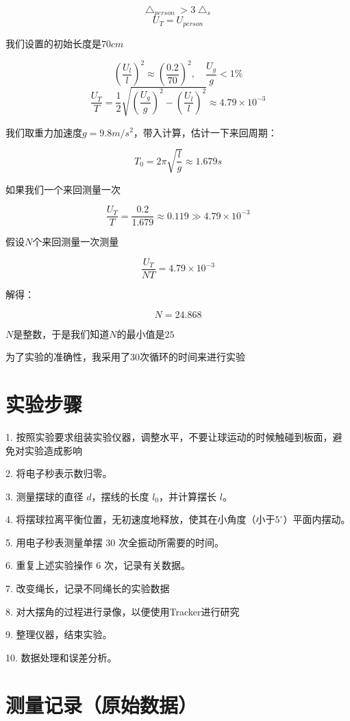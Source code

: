 \documentclass{article}
\begin{document}
        \[\bigtriangleup_{person}>3\bigtriangleup_{s}\]
        \[U_{T}=U_{person}\]

        我们设置的初始长度是$70cm$

        \[(\frac{U_{l}}{l})^2\approx (\frac{0.2}{70})^2 ,\quad \frac{U_{g}}{g}<1\%\]
        \[\frac{U_{T}}{T}=\frac{1}{2}\sqrt{(\frac{U_{g}}{g})^2-(\frac{U_{l}}{l})^2}\approx 4.79\times 10^{-3}\]

        我们取重力加速度$g=9.8m/s^{2}$，带入计算，估计一下来回周期：

        \[T_{0}=2\pi\sqrt{\frac{l}{g}}\approx 1.679s\]

        如果我们一个来回测量一次

        \[\frac{U_{T}}{T}=\frac{0.2}{1.679}\approx 0.119 \gg 4.79\times 10^{-3}\]

        假设$N$个来回测量一次测量

        \[\frac{U_{T}}{NT}=4.79\times 10^{-3}\]

        解得：

        \[N=24.868\]

        $N$是整数，于是我们知道$N$的最小值是$25$

        为了实验的准确性，我采用了30次循环的时间来进行实验

\section{实验步骤}

    1. 按照实验要求组装实验仪器，调整水平，不要让球运动的时候触碰到板面，避免对实验造成影响

    2. 将电子秒表示数归零。

    3. 测量摆球的直径 $d$，摆线的长度 $l_{0}$，并计算摆长 $l$。

    4. 将摆球拉离平衡位置，无初速度地释放，使其在小角度（小于$5^\circ $）平面内摆动。
    
    5. 用电子秒表测量单摆 30 次全振动所需要的时间。
    
    6. 重复上述实验操作 6 次，记录有关数据。

    7. 改变绳长，记录不同绳长的实验数据

    8. 对大摆角的过程进行录像，以便使用Tracker进行研究
    
    9. 整理仪器，结束实验。
    
    10. 数据处理和误差分析。

\section{测量记录（原始数据）}
\end{document}
